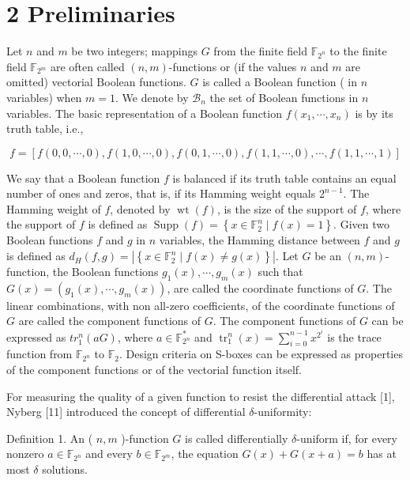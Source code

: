 \documentclass[10pt]{article}
\begin{document}
\section*{2 Preliminaries}
Let $n$ and $m$ be two integers; mappings $G$ from the finite field $\mathbb{F}_{2^{n}}$ to the finite field $\mathbb{F}_{2^{m}}$ are often called $(n, m)$-functions or (if the values $n$ and $m$ are omitted) vectorial Boolean functions. $G$ is called a Boolean function ( in $n$ variables) when $m=1$. We denote by $\mathcal{B}_{n}$ the set of Boolean functions in $n$ variables. The basic representation of a Boolean function $f\left(x_{1}, \cdots, x_{n}\right)$ is by its truth table, i.e.,

$$
f=[f(0,0, \cdots, 0), f(1,0, \cdots, 0), f(0,1, \cdots, 0), f(1,1, \cdots, 0), \cdots, f(1,1, \cdots, 1)]
$$

We say that a Boolean function $f$ is balanced if its truth table contains an equal number of ones and zeros, that is, if its Hamming weight equals $2^{n-1}$. The Hamming weight of $f$, denoted by $\operatorname{wt}(f)$, is the size of the support of $f$, where the support of $f$ is defined as $\operatorname{Supp}(f)=\left\{x \in \mathbb{F}_{2}^{n} \mid f(x)=1\right\}$. Given two Boolean functions $f$ and $g$ in $n$ variables, the Hamming distance between $f$ and $g$ is defined as $d_{H}(f, g)=\left|\left\{x \in \mathbb{F}_{2}^{n} \mid f(x) \neq g(x)\right\}\right|$. Let $G$ be an $(n, m)$-function, the Boolean functions $g_{1}(x), \cdots, g_{m}(x)$ such that $G(x)= \left(g_{1}(x), \cdots, g_{m}(x)\right)$, are called the coordinate functions of $G$. The linear combinations, with non all-zero coefficients, of the coordinate functions of $G$ are called the component functions of $G$. The component functions of $G$ can be expressed as $t r_{1}^{n}(a G)$, where $a \in \mathbb{F}_{2^{n}}^{*}$ and $\operatorname{tr}_{1}^{n}(x)=\sum_{i=0}^{n-1} x^{2^{i}}$ is the trace function from $\mathbb{F}_{2^{n}}$ to $\mathbb{F}_{2}$. Design criteria on S-boxes can be expressed as properties of the component functions or of the vectorial function itself.

For measuring the quality of a given function to resist the differential attack [1], Nyberg [11] introduced the concept of differential $\delta$-uniformity:

Definition 1. An ( $n, m$ )-function $G$ is called differentially $\delta$-uniform if, for every nonzero $a \in \mathbb{F}_{2^{n}}$ and every $b \in \mathbb{F}_{2^{m}}$, the equation $G(x)+G(x+a)=b$ has at most $\delta$ solutions.
\end{document}
